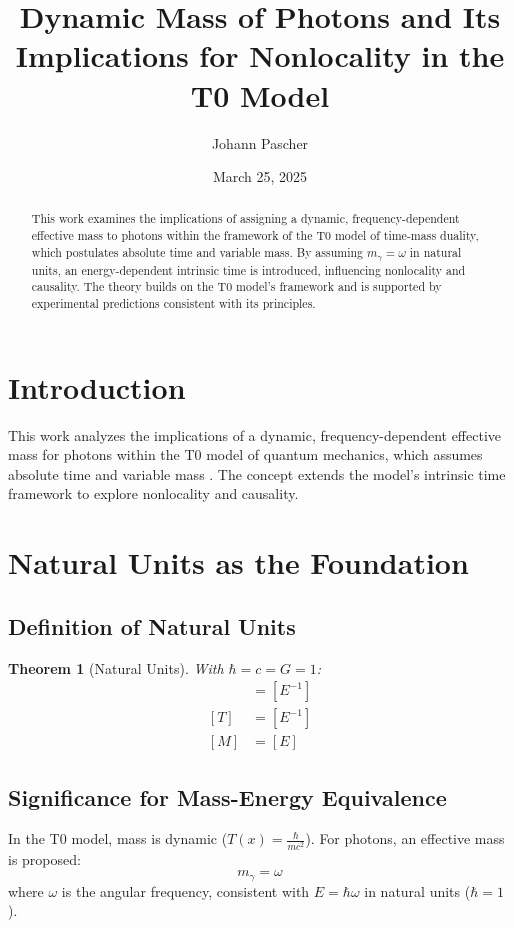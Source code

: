 \documentclass[12pt,a4paper]{article}
\title{Dynamic Mass of Photons and Its Implications for Nonlocality in the T0 Model}
\author{Johann Pascher}
\date{March 25, 2025}
\newcommand{\Tfield}{T(x)}
\newtheorem{theorem}{Theorem}[section]
\begin{document}
	
	\maketitle
	
	\begin{abstract}
		This work examines the implications of assigning a dynamic, frequency-dependent effective mass to photons within the framework of the T0 model of time-mass duality, which postulates absolute time and variable mass. By assuming \(m_\gamma = \omega\) in natural units, an energy-dependent intrinsic time is introduced, influencing nonlocality and causality. The theory builds on the T0 model’s framework and is supported by experimental predictions consistent with its principles.
	\end{abstract}
	
	\tableofcontents
	\newpage
	
	\section{Introduction}
	This work analyzes the implications of a dynamic, frequency-dependent effective mass for photons within the T0 model of quantum mechanics, which assumes absolute time and variable mass \cite{pascher_galaxies_2025}. The concept extends the model’s intrinsic time framework to explore nonlocality and causality.
	
	\section{Natural Units as the Foundation}
	\subsection{Definition of Natural Units}
	\begin{theorem}[Natural Units]
		With \(\hbar = c = G = 1\):
		\begin{align}
			[L] &= [E^{-1}] \\
			[T] &= [E^{-1}] \\
			[M] &= [E]
		\end{align}
	\end{theorem}
	
	\subsection{Significance for Mass-Energy Equivalence}
	In the T0 model, mass is dynamic (\(\Tfield = \frac{\hbar}{m c^2}\)). For photons, an effective mass is proposed:
	\begin{equation}
		m_\gamma = \omega
	\end{equation}
	where \(\omega\) is the angular frequency, consistent with \(E = \hbar \omega\) in natural units (\(\hbar = 1\)).
	
\end{document}

